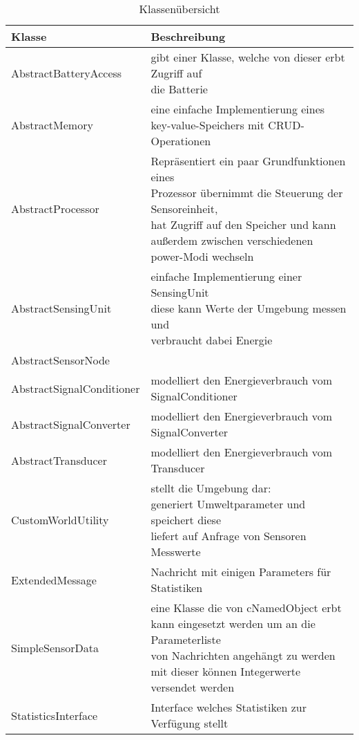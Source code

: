 \begin{table}[!ht]
  \centering
  \caption{Klassenübersicht}
  \label{Klassenübersicht}
\begin{tabularx}{\textwidth}{ll}
	\toprule
	Klasse & Beschreibung \\
	\midrule\midrule
	AbstractBatteryAccess &	\specialcell{gibt einer Klasse, welche von dieser erbt Zugriff auf \\die Batterie} \\\midrule
AbstractMemory & \specialcell{eine einfache Implementierung eines \\key-value-Speichers mit CRUD-Operationen}\\\midrule
AbstractProcessor	& \specialcell{Repräsentiert ein paar Grundfunktionen eines \\ Prozessor übernimmt die Steuerung der Sensoreinheit, \\ hat Zugriff auf den Speicher und  kann \\außerdem zwischen verschiedenen power-Modi wechseln }\\\midrule
AbstractSensingUnit & \specialcell{einfache Implementierung einer SensingUnit \\ diese kann Werte der Umgebung messen und \\verbraucht dabei Energie}\\\midrule
AbstractSensorNode	& \specialcell{ist hauptsächlich für die Initialisierung zuständig}\\\midrule
AbstractSignalConditioner	& modelliert den Energieverbrauch vom SignalConditioner \\\midrule
AbstractSignalConverter	& modelliert den Energieverbrauch vom SignalConverter\\\midrule
AbstractTransducer	& modelliert den Energieverbrauch vom Transducer\\\midrule
CustomWorldUtility	& \specialcell{stellt die Umgebung dar:\\ generiert Umweltparameter und speichert diese\\ liefert auf Anfrage von Sensoren Messwerte}\\\midrule
ExtendedMessage & Nachricht mit einigen Parameters für Statistiken\\\midrule
SimpleSensorData	& \specialcell{eine Klasse die von cNamedObject erbt\\ kann eingesetzt werden um an die Parameterliste \\von Nachrichten angehängt zu werden\\mit dieser können Integerwerte versendet werden}\\\midrule
StatisticsInterface & Interface welches Statistiken zur Verfügung stellt\\
	\bottomrule
\end{tabularx}
\end{table}

